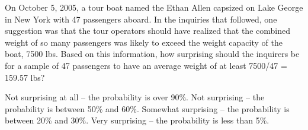 \documentclass{article}
\begin{document}
\begin{mcquestions}
		\question On October 5, 2005, a tour boat named the Ethan Allen capsized on Lake George in New York with 47 passengers aboard. In the inquiries that followed, one suggestion was that the tour operators should have realized that the combined weight of so many passengers was likely to exceed the weight capacity of the boat, 7500 lbs.
		Based on this information, how surprising should the inquirers be for a sample of 47 passengers to have an average weight of at least 7500/47 = 159.57 lbs?
		\begin{mcanswerslist}
			\answer[correct]  Not surprising at all – the probability is over 90\%.
			\answer  Not surprising – the probability is between 50\% and 60\%.
			\answer  Somewhat surprising – the probability is between 20\% and 30\%.
			\answer  Very surprising – the probability is less than 5\%.
		\end{mcanswerslist}
	\end{mcquestions}
\end{document}
